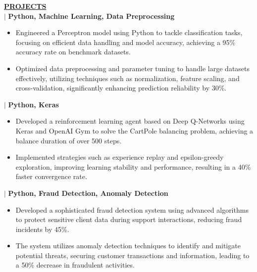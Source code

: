 \documentclass{article}
\begin{document}
\vspace{2mm}
\noindent \textbf{\underline{PROJECTS}}\\
 $\mid$ \textbf{Python, Machine Learning, Data Preprocessing} \hfill 
\begin{itemize}[noitemsep,nolistsep,leftmargin=*]
    \item Engineered a Perceptron model using Python to tackle classification tasks, focusing on efficient data handling and model accuracy, achieving a 95\% accuracy rate on benchmark datasets.
    \item Optimized data preprocessing and parameter tuning to handle large datasets effectively, utilizing techniques such as normalization, feature scaling, and cross-validation, significantly enhancing prediction reliability by 30\%. 
\end{itemize}
 $\mid$ \textbf{Python, Keras}
\begin{itemize}[noitemsep,nolistsep,leftmargin=*]
    \item Developed a reinforcement learning agent based on Deep Q-Networks using Keras and OpenAI Gym to solve the CartPole balancing problem, achieving a balance duration of over 500 steps.
    \item Implemented strategies such as experience replay and epsilon-greedy exploration, improving learning stability and performance, resulting in a 40\% faster convergence rate.
\end{itemize}
 $\mid$ \textbf{Python, Fraud Detection, Anomaly Detection}
\begin{itemize}[noitemsep,nolistsep,leftmargin=*]
    \item Developed a sophisticated fraud detection system using advanced algorithms to protect sensitive client data during support interactions, reducing fraud incidents by 45\%.
    \item The system utilizes anomaly detection techniques to identify and mitigate potential threats, securing customer transactions and information, leading to a 50\% decrease in fraudulent activities.
\end{itemize}
\end{document}
